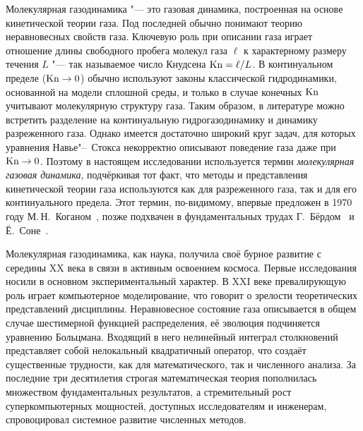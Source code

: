 Молекулярная газодинамика "--- это газовая динамика, построенная на основе кинетической теории газа.
Под последней обычно понимают теорию неравновесных свойств газа.
Ключевую роль при описании газа играет отношение длины свободного пробега молекул газа \(\ell\)
к характерному размеру течения \(L\) "--- так называемое число Кнудсена \(\mathrm{Kn}=\ell/L\).
В континуальном пределе (\(\mathrm{Kn}\to0\)) обычно используют законы классической гидродинамики,
основанной на модели сплошной среды, и только в случае конечных \(\mathrm{Kn}\)
учитывают молекулярную структуру газа. Таким образом, в литературе можно встретить
разделение на континуальную гидрогазодинамику и динамику разреженного газа.
Однако имеется достаточно широкий круг задач, для которых уравнения Навье"--~Стокса
некорректно описывают поведение газа даже при \(\mathrm{Kn}\to0\).
Поэтому в настоящем исследовании используется термин \emph{молекулярная газовая динамика},
подчёркивая тот факт, что методы и представления кинетической теории газа используются
как для разреженного газа, так и для его континуального предела.
Этот термин, по-видимому, впервые предложен в 1970 году М.\,Н.~Коганом~\autocite{Kogan1971review},
позже подхвачен в фундаментальных трудах Г.~Бёрдом~\autocite{Bird1981} и Ё.~Соне~\autocite{Sone2007}.

{\actuality}
Молекулярная газодинамика, как наука, получила своё бурное развитие с середины XX века
в связи в активным освоением космоса. Первые исследования носили в основном экспериментальный
характер. В XXI веке превалирующую роль играет компьютерное моделирование, что
говорит о зрелости теоретических представлений дисциплины.
Неравновесное состояние газа описывается в общем случае шестимерной функцией распределения,
её эволюция подчиняется уравнению Больцмана.
Входящий в него нелинейный интеграл столкновений представляет собой нелокальный квадратичный оператор,
что создаёт существенные трудности, как для математического, так и численного анализа.
За последние три десятилетия строгая математическая теория пополнилась множеством фундаментальных результатов,
а стремительный рост суперкомпьютерных мощностей, доступных исследователям и инженерам,
спровоцировал системное развитие численных методов.

